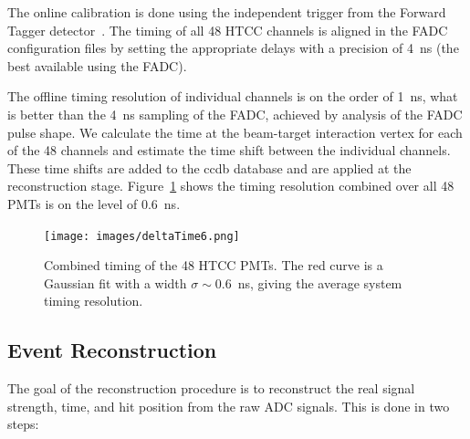 The online calibration is done using the independent trigger from the Forward Tagger detector~\cite{ft-nim}. The
timing of all 48 HTCC channels is aligned in the FADC configuration files by setting the appropriate delays with a
precision of 4~ns (the best available using the FADC). 

The offline timing resolution of individual channels is on the order of 1~ns, what is better than the 4~ns sampling of the FADC, achieved by analysis of the FADC pulse shape. We calculate the time at the beam-target interaction vertex for each of the 48 channels and estimate the time shift between the individual channels. These time shifts are added to the ccdb database and are applied at the reconstruction stage. Figure~\ref{fig:htcccombinedTimingResponce} shows the timing resolution combined over all 48 PMTs is on the level of 0.6~ns.

\begin{figure}[ht]
\centering
\texttt{[image: images/deltaTime6.png]}
\caption{Combined timing of the 48 HTCC PMTs. The red curve is a Gaussian fit with a width $\sigma \sim$0.6~ns,
  giving the average system timing resolution.}
\label{fig:htcccombinedTimingResponce}
\end{figure}

\subsection{Event Reconstruction}

The goal of the reconstruction procedure is to reconstruct the real signal strength, time, and hit position from the
raw ADC signals. This is done in two steps:


